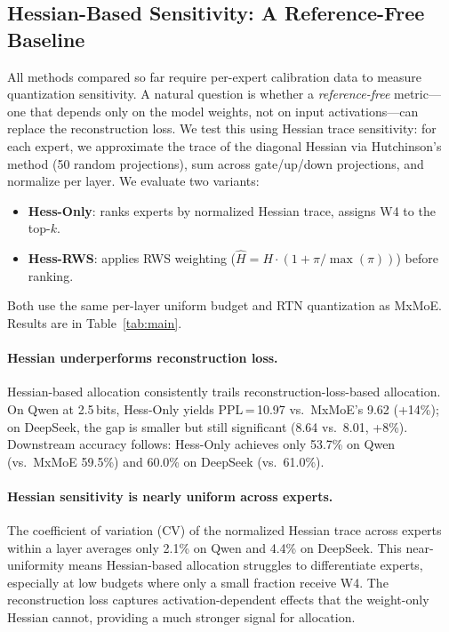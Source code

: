 \subsection{Hessian-Based Sensitivity: A Reference-Free Baseline}
\label{sec:hessian}

All methods compared so far require per-expert calibration data to measure quantization sensitivity. A natural question is whether a \emph{reference-free} metric---one that depends only on the model weights, not on input activations---can replace the reconstruction loss. We test this using Hessian trace sensitivity: for each expert, we approximate the trace of the diagonal Hessian via Hutchinson's method (50 random projections), sum across gate/up/down projections, and normalize per layer. We evaluate two variants:
\begin{itemize}
    \item \textbf{Hess-Only}: ranks experts by normalized Hessian trace, assigns W4 to the top-$k$.
    \item \textbf{Hess-RWS}: applies RWS weighting ($\hat{H} = H \cdot (1 + \pi/\max(\pi))$) before ranking.
\end{itemize}
Both use the same per-layer uniform budget and RTN quantization as MxMoE. Results are in Table~\ref{tab:main}.

\paragraph{Hessian underperforms reconstruction loss.}
Hessian-based allocation consistently trails reconstruction-loss-based allocation. On Qwen at 2.5\,bits, Hess-Only yields PPL\,=\,10.97 vs.\ MxMoE's 9.62 (+14\%); on DeepSeek, the gap is smaller but still significant (8.64 vs.\ 8.01, +8\%). Downstream accuracy follows: Hess-Only achieves only 53.7\% on Qwen (vs.\ MxMoE 59.5\%) and 60.0\% on DeepSeek (vs.\ 61.0\%).

\paragraph{Hessian sensitivity is nearly uniform across experts.}
The coefficient of variation (CV) of the normalized Hessian trace across experts within a layer averages only 2.1\% on Qwen and 4.4\% on DeepSeek. This near-uniformity means Hessian-based allocation struggles to differentiate experts, especially at low budgets where only a small fraction receive W4. The reconstruction loss captures activation-dependent effects that the weight-only Hessian cannot, providing a much stronger signal for allocation.

